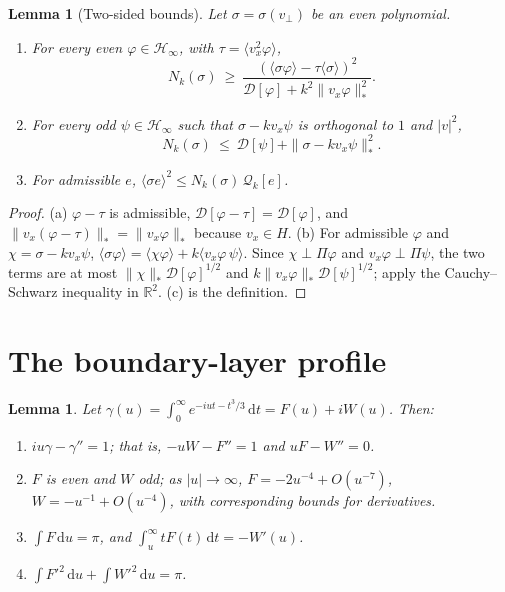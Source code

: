 \documentclass[11pt]{article}
\newcommand{\dd}{\mathrm{d}}
\newcommand{\cD}{\mathcal{D}}
\newcommand{\cH}{\mathcal{H}}
\newcommand{\cQ}{\mathcal{Q}}
\newcommand{\avg}[1]{\langle #1\rangle}
\newcommand{\nstar}[1]{\|#1\|_*}
\newtheorem{lemma}[theorem]{Lemma}
\theoremstyle{remark}
\begin{document}
\begin{lemma}[Two-sided bounds]\label{lem:two}
Let $\sigma=\sigma(v_\perp)$ be an even polynomial.
\begin{enumerate}
  \item[(a)] For every even $\varphi\in\cH_\infty$, with
    $\tau=\avg{v_x^2\varphi}$,
    \[
      N_k(\sigma)\ \ge\ \frac{(\avg{\sigma\varphi}-\tau\avg{\sigma})^2}
      {\cD[\varphi]+k^2\nstar{v_x\varphi}^2}.
    \]
  \item[(b)] For every odd $\psi\in\cH_\infty$ such that
    $\sigma-kv_x\psi$ is orthogonal to $1$ and $|v|^2$,
    \[
      N_k(\sigma)\ \le\ \cD[\psi]+\nstar{\sigma-kv_x\psi}^2 .
    \]
  \item[(c)] For admissible $e$, $\avg{\sigma e}^2\le N_k(\sigma)\,\cQ_k[e]$.
\end{enumerate}
\end{lemma}

\begin{proof}
(a) $\varphi-\tau$ is admissible, $\cD[\varphi-\tau]=\cD[\varphi]$, and
$\nstar{v_x(\varphi-\tau)}=\nstar{v_x\varphi}$ because $v_x\in H$.
(b) For admissible $\varphi$ and $\chi=\sigma-kv_x\psi$,
$\avg{\sigma\varphi}=\avg{\chi\varphi}+k\avg{v_x\varphi\,\psi}$. Since
$\chi\perp\Pi\varphi$ and $v_x\varphi\perp\Pi\psi$, the two terms are at most
$\nstar{\chi}\cD[\varphi]^{1/2}$ and $k\nstar{v_x\varphi}\cD[\psi]^{1/2}$;
apply the Cauchy--Schwarz inequality in $\mathbb{R}^2$. (c) is the
definition.
\end{proof}

\section{The boundary-layer profile}

\begin{lemma}\label{lem:airy}
Let $\gamma(u)=\int_0^\infty e^{-iut-t^3/3}\,\dd t=F(u)+iW(u)$. Then:
\begin{enumerate}
  \item[(a)] $iu\gamma-\gamma''=1$; that is, $-uW-F''=1$ and $uF-W''=0$.
  \item[(b)] $F$ is even and $W$ odd; as $|u|\to\infty$,
    $F=-2u^{-4}+O(u^{-7})$, $W=-u^{-1}+O(u^{-4})$, with corresponding
    bounds for derivatives.
  \item[(c)] $\int F\,\dd u=\pi$, and
    $\int_u^\infty tF(t)\,\dd t=-W'(u)$.
  \item[(d)] $\int F'^2\,\dd u+\int W'^2\,\dd u=\pi$.
\end{enumerate}
\end{lemma}
\end{document}
